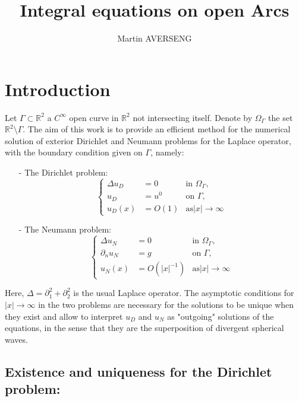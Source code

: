 \documentclass[10pt,a4paper]{article}
\author{Martin AVERSENG}
\title{Integral equations on open Arcs}
\begin{document}
\section{Introduction}

Let $\Gamma \subset \mathbb{R}^2$ a $C^{\infty}$ open curve in $\mathbb{R}^2$ not intersecting itself. Denote by \newcommand{\Omegam}{\Omega_\Gamma} $\Omega_\Gamma$ the set $\mathbb{R}^2\setminus \Gamma$. The aim of this work is to provide an efficient method for the numerical solution of exterior Dirichlet and Neumann problems for the Laplace operator, with the boundary condition given on $\Gamma$, namely: 
\begin{itemize}
	\item[-] The Dirichlet problem: 
	 \begin{equation}
			\left\{\begin{array}{rlll}
			\Delta u_D &= 0 & \text{in } \Omegam,\\
			u_D &= u^{0} & \text{on } \Gamma,\\
		    u_D(x) & = O(1) & \text{as} |x| \to \infty	
			\end{array}\right.
			\label{DirichletProblem}
		\end{equation}
	\item[-] The Neumann problem: 
		\begin{equation}
			\left\{\begin{array}{rlll}
			\Delta u_N &= 0 & \text{in } \Omegam,\\
			\partial_n u_N &= g & \text{on } \Gamma, \\
			u_N(x) &= O(|x|^{-1}) & \text{as} |x| \to \infty		 
			\end{array}\right.
			\label{NeumannProblem}
		\end{equation}
\end{itemize}
Here, $\Delta = \partial_1^2 + \partial_2^2$ is the usual Laplace operator. 
The asymptotic conditions for $|x| \to \infty$ in the two problems are necessary for the solutions to be unique when they exist and allow to interpret $u_D$ and $u_N$ as "outgoing" solutions of the equations, in the sense that they are the superposition of divergent spherical waves.  

\subsection*{Existence and uniqueness for the Dirichlet problem: }
\end{document}
